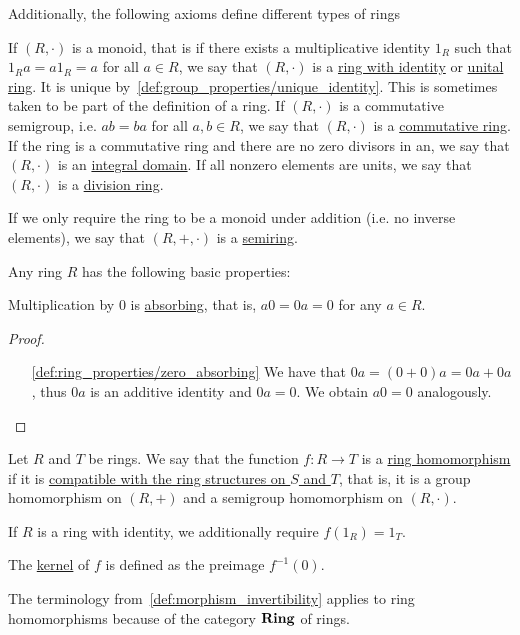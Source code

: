 \begin{definition}
  Additionally, the following axioms define different types of rings
  \begin{description}
     If $(R, \cdot)$ is a monoid, that is if there exists a multiplicative identity $1_R$ such that $1_R a = a1_R = a$ for all $a \in R$, we say that $(R, \cdot)$ is a \ul{ring with identity} or \ul{unital ring}. It is unique by~\cref{def:group_properties/unique_identity}. This is sometimes taken to be part of the definition of a ring.
     If $(R, \cdot)$ is a commutative semigroup, i.e. $ab = ba$ for all $a, b \in R$, we say that $(R, \cdot)$ is a \ul{commutative ring}.
     If the ring is a commutative ring and there are no zero divisors in an, we say that $(R, \cdot)$ is an \ul{integral domain}.
     If all nonzero elements are units, we say that $(R, \cdot)$ is a \ul{division ring}.
  \end{description}

  If we only require the ring to be a monoid under addition (i.e. no inverse elements), we say that $(R, +, \cdot)$ is a \ul{semiring}.
\end{definition}

\begin{proposition}\label{def:ring_properties}
  Any ring $R$ has the following basic properties:
  \begin{defenum}
    \item\label{def:ring_properties/zero_absorbing} Multiplication by $0$ is \ul{absorbing}, that is, $a0 = 0a = 0$ for any $a \in R$.
  \end{defenum}
\end{proposition}
\begin{proof}\mbox{}
  \begin{itemize}
    \item[\ref{def:ring_properties/zero_absorbing}] We have that $0a = (0 + 0)a = 0a + 0a$, thus $0a$ is an additive identity and $0a = 0$. We obtain $a0 = 0$ analogously.
  \end{itemize}
\end{proof}

\begin{definition}\label{def:ring_homomorphism}
  Let $R$ and $T$ be rings. We say that the function $f: R \to T$ is a \ul{ring homomorphism} if it is \ul{compatible with the ring structures on $S$ and $T$}, that is, it is a group homomorphism on $(R, +)$ and a semigroup homomorphism on $(R, \cdot)$.

  If $R$ is a ring with identity, we additionally require $f(1_R) = 1_T$.

  The \ul{kernel} of $f$ is defined as the preimage $f^{-1}(0)$.

  The terminology from~\cref{def:morphism_invertibility} applies to ring homomorphisms because of the category $\operatorname{\mathbf{Ring}}$ of rings.
\end{definition}

